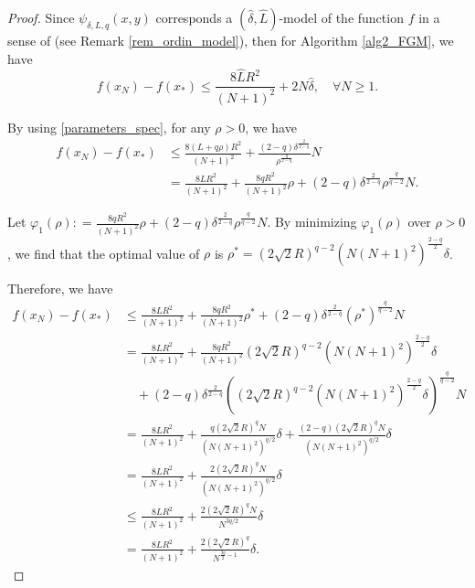 \documentclass[11pt]{amsart}
\theoremstyle{definition}
\numberwithin{equation}{section}
\begin{document}
\begin{proof}
Since $\psi_{\delta,L, q} (x, y)$ corresponds a $(\widehat{\delta}, \widehat{L})$-model of the function $f$ in a sense of \cite{Gasnikov2019fast} (see Remark \ref{rem_ordin_model}), then for Algorithm \ref{alg2_FGM}, we have \cite{Gasnikov2019fast}
\begin{equation*}
    f(x_N) - f(x_*) \leq \frac{8 \widehat{L} R^2}{(N+1)^2} + 2 N \widehat{\delta}, \quad \forall N \geq 1. 
\end{equation*} 

By using \eqref{parameters_spec}, for any $\rho > 0$, we have
\begin{align*}
    f(x_N) - f(x_*) 
    & \leq \frac{8 (L + q \rho) R^2}{(N+1)^2} + \frac{(2-q) \delta^{\frac{2}{2-q}}}{ \rho^{\frac{q}{2-q}}} N 
    \\& = \frac{8 L R^2}{(N+1)^2} + \frac{8 q R^2}{(N+1)^2} \rho + (2-q) \delta^{\frac{2}{2-q}} \rho^{\frac{q}{q-2}} N.
\end{align*}

Let $\varphi_1(\rho) : = \frac{8 q R^2}{(N+1)^2} \rho + (2-q) \delta^{\frac{2}{2-q}} \rho^{\frac{q}{q-2}} N$.  By minimizing $\varphi_1(\rho)$ over $\rho >0$, we find that the optimal value of $\rho$ is $\rho^* = \left(2\sqrt{2}R\right)^{q-2} \left(N(N+1)^2\right)^{\frac{2-q}{2}} \delta$. 

Therefore, we have
\begin{align*}
    f(x_N) - f(x_*) & \leq  \frac{8 L R^2}{(N+1)^2} + \frac{8 q R^2}{(N+1)^2} \rho^* + (2-q) \delta^{\frac{2}{2-q}} \left(\rho^*\right)^{\frac{q}{q-2}} N
    \\& = \frac{8 L R^2}{(N+1)^2} + \frac{8 q R^2}{(N+1)^2} \left(2\sqrt{2}R\right)^{q-2} \left(N(N+1)^2\right)^{\frac{2-q}{2}} \delta 
    \\& \quad + (2-q) \delta^{\frac{2}{2-q}} \left(\left(2\sqrt{2}R\right)^{q-2} \left(N(N+1)^2\right)^{\frac{2-q}{2}} \delta\right)^{\frac{q}{q-2}} N
    \\& = \frac{8 L R^2}{(N+1)^2} + \frac{q  \left(2\sqrt{2}R\right)^{q} N}{\left(N(N+1)^2\right)^{q/2}} \delta + \frac{(2-q)\left(2\sqrt{2}R\right)^{q} N}{\left(N(N+1)^2\right)^{q/2}} \delta
    \\& = \frac{8 L R^2}{(N+1)^2} + \frac{2\left(2\sqrt{2}R\right)^{q} N}{\left(N(N+1)^2\right)^{q/2}} \delta
    \\& \leq  \frac{8 L R^2}{(N+1)^2} + \frac{2 \left(2\sqrt{2}R\right)^q N}{N^{3q/2}} \delta
    \\& = \frac{8 L R^2}{(N+1)^2} + \frac{2 \left(2\sqrt{2}R\right)^q }{N^{\frac{3q}{2} - 1 }} \delta. 
\end{align*} 
\end{proof}
\end{document}
